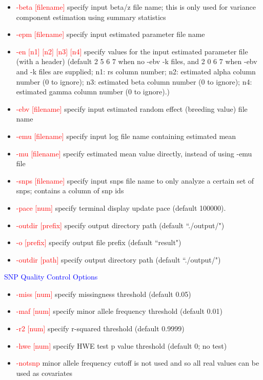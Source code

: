 \documentclass[11pt]{article}
\begin{document}
\begin{itemize}
\item  \textcolor{red}{ -beta        [filename] }     \quad      specify input beta/z file name; this is only used for variance component estimation using summary statistics
\item  \textcolor{red}{ -epm        [filename] }     \quad    specify input estimated parameter file name
\item  \textcolor{red}{ -en [n1]  [n2]  [n3]  [n4]}     \quad    specify values for the input estimated parameter file (with a header) (default 2 5 6 7 when no -ebv -k files, and 2 0 6 7 when -ebv and -k files are supplied; n1: rs column number; n2: estimated alpha column number (0 to ignore); n3: estimated beta column number (0 to ignore); n4: estimated gamma column number (0 to ignore).)
\item  \textcolor{red}{ -ebv        [filename] }     \quad    specify input estimated random effect (breeding value) file name
\item  \textcolor{red}{ -emu        [filename] }     \quad    specify input log file name containing estimated mean
\item  \textcolor{red}{ -mu        [filename] }     \quad    specify estimated mean value directly, instead of using -emu file
\item  \textcolor{red}{ -snps        [filename] }     \quad    specify input snps file name to only analyze a certain set of snps; contains a column of snp ids
\item  \textcolor{red}{ -pace     [num]}     \quad           specify terminal display update pace (default 100000).
\item  \textcolor{red}{ -outdir        [prefix]}     \quad        specify output directory path (default ``./output/")
\item  \textcolor{red}{ -o        [prefix]}     \quad        specify output file prefix (default ``result")
\item  \textcolor{red}{ -outdir        [path]}     \quad        specify output directory path (default ``./output/")
\end{itemize}
%
\textcolor{blue}{SNP Quality Control Options}
%
\begin{itemize}
\item  \textcolor{red}{-miss     [num] }     \quad          specify missingness threshold (default 0.05)
\item  \textcolor{red}{-maf      [num] }     \quad          specify minor allele frequency threshold (default 0.01)
\item  \textcolor{red}{-r2      [num] }     \quad           specify r-squared threshold (default 0.9999)
\item  \textcolor{red}{-hwe      [num] }     \quad           specify HWE test p value threshold (default 0; no test)
\item  \textcolor{red}{-notsnp  }     \quad          minor allele frequency cutoff is not used and so all real values can be used as covariates
\end{itemize}
\end{document}
